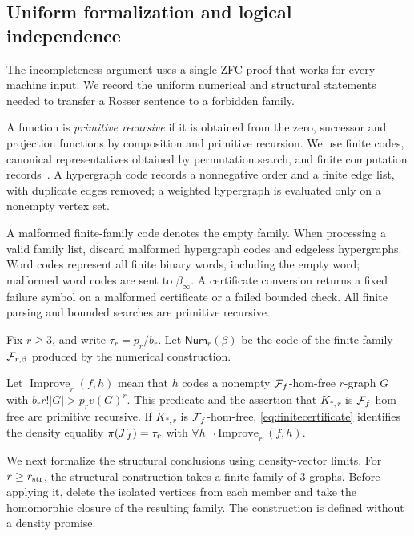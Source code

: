 \documentclass[10pt]{article}
\numberwithin{equation}{section}
\theoremstyle{definition}
\newcommand{\Improve}{\operatorname{Improve}}
\begin{document}
\subsection{Uniform formalization and logical independence}\label{sec:logic}
The incompleteness argument uses a single ZFC proof that works for every machine input. We record the uniform numerical and structural statements needed to transfer a Rosser sentence to a forbidden family.

A function is \emph{primitive recursive} if it is obtained from the zero, successor and projection functions by composition and primitive recursion. We use finite codes, canonical representatives obtained by permutation search, and finite computation records~\cite{Rogers1967,Soare1987}. A hypergraph code records a nonnegative order and a finite edge list, with duplicate edges removed; a weighted hypergraph is evaluated only on a nonempty vertex set.

A malformed finite-family code denotes the empty family. When processing a valid family list, discard malformed hypergraph codes and edgeless hypergraphs. Word codes represent all finite binary words, including the empty word; malformed word codes are sent to $\beta_\infty$. A certificate conversion returns a fixed failure symbol on a malformed certificate or a failed bounded check. All finite parsing and bounded searches are primitive recursive.

Fix $r\ge3$, and write $\tau_r=p_r/b_r$. Let $\mathsf{Num}_r(\beta)$ be the code of the finite family $\mathcal F_{r,\beta}$ produced by the numerical construction.

Let $\Improve_r(f,h)$ mean that $h$ codes a nonempty $\mathcal F_f$-hom-free $r$-graph $G$ with $b_rr!|G|>p_rv(G)^r$. This predicate and the assertion that $K_{*,r}$ is $\mathcal F_f$-hom-free are primitive recursive. If $K_{*,r}$ is $\mathcal F_f$-hom-free, \eqref{eq:finitecertificate} identifies the density equality $\pi(\mathcal F_f)=\tau_r$ with $\forall h\,\neg\Improve_r(f,h)$.

We next formalize the structural conclusions using density-vector limits. For $r\ge r_{\rm str}$, the structural construction takes a finite family of $3$-graphs. Before applying it, delete the isolated vertices from each member and take the homomorphic closure of the resulting family. The construction is defined without a density promise.
\end{document}
